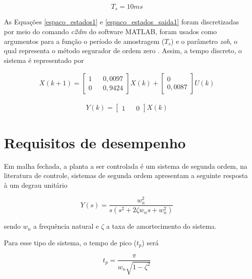 \begin{equation}
    T_s = 10 ms
    \label{periodo_amostragem}
\end{equation}

As Equações \ref{espaco_estados1} e \ref{espaco_estados_saida1} foram discretizadas por meio do comando \textit{c2dm} do software MATLAB, foram usados como argumentos para a função o período de amostragem ($T_s$) e o parâmetro \textit{zoh}, o qual representa o método segurador de ordem zero \cite{franklin2013sistemas}. Assim, a tempo discreto, o sistema é representado por

\begin{gather}
    X(k+1)=
    \begin{bmatrix}
        1 && 0,0097 \\ 0 && 0,9424
    \end{bmatrix}
    X(k)
    +
    \begin{bmatrix}
        0 \\ 0,0087
    \end{bmatrix}
    U(k)
    \label{espaco_estados_d}
\end{gather}

\begin{gather}
    Y(k)=
    \begin{bmatrix}
        1 && 0
    \end{bmatrix}
    X(k)
    \label{espaco_estados_saida_d}
\end{gather}

\section{Requisitos de desempenho}

Em malha fechada, a planta a ser controlada é um sistema de segunda ordem, na literatura de controle, sistemas de segunda ordem apresentam a seguinte resposta à um degrau unitário

\begin{equation}
    Y(s)=\frac{w_n^2}{s(s^2+2\zeta w_n s+w_n^2)}
    \label{resposta_ordem2}
\end{equation}

\noindent sendo $w_n$ a frequência natural e $\zeta$ a taxa de amortecimento do sistema.

Para esse tipo de sistema, o tempo de pico ($t_p$) será

\begin{equation}
    t_p=\frac{\pi}{w_n \sqrt{1-\zeta^2}}
    \label{tempo_pico}
\end{equation}

